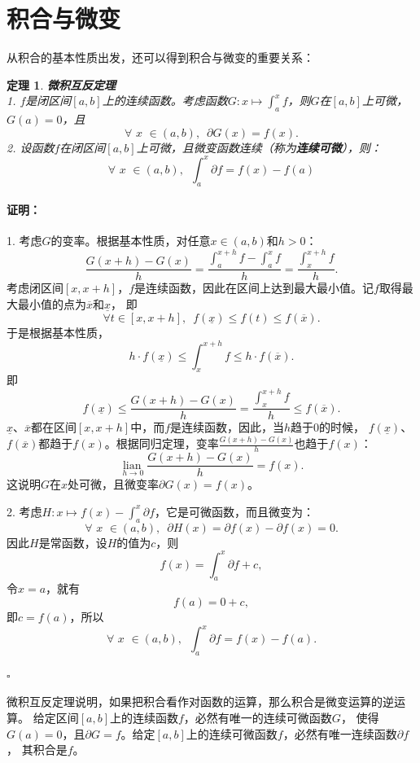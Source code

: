 \documentclass[12pt,UTF8]{ctexbook}
\newcommand{\lian}[1]{
    \underset{#1}{\operatorname{lian}\,}
}
\renewenvironment{proof}{\paragraph{\textbf{证明：}}}{\hfill$\square$}
\newtheorem{tm}{定理}[section]
\begin{document}
\section{积合与微变}
从积合的基本性质出发，还可以得到积合与微变的重要关系：

\begin{tm}{\textbf{微积互反定理}}
    \mbox{} \\
    1. $f$是闭区间$[a,b]$上的连续函数。考虑函数$G: x\mapsto \int_a^x f$，则$G$在$[a,b]$上可微，
    $G(a) = 0$，且
    $$\forall \,\, x\,\,\in(a, b), \,\,\, \partial G (x) = f(x).$$
    2. 设函数$f$在闭区间$[a,b]$上可微，且微变函数连续（称为\textbf{连续可微}），则：
    $$ \forall \,\, x\,\,\in(a, b), \,\,\, \int_a^x \partial f = f(x) - f(a) $$
\end{tm}

\begin{proof}
    1. 考虑$G$的变率。根据基本性质，对任意$x\in(a, b)$和$h>0$：
    $$ \frac{G(x+h) - G(x)}{h} = \frac{\int_a^{x+h} f - \int_a^x f}{h} = \frac{\int_x^{x+h} f}{h}. $$
    考虑闭区间$[x, x+h]$，$f$是连续函数，因此在区间上达到最大最小值。记$f$取得最大最小值的点为$\overline{x}$和$\underline{x}$，
    即
    $$ \forall t \in [x, x+h] ,\,\,\, f(\underline{x}) \leqslant f(t) \leqslant f(\overline{x}). $$
    于是根据基本性质，
    $$ h\cdot f(\underline{x}) \leqslant \int_x^{x+h} f \leqslant h\cdot f(\overline{x}). $$
    即
    $$ f(\underline{x}) \leqslant \frac{G(x+h) - G(x)}{h} = \frac{\int_x^{x+h} f}{h} \leqslant f(\overline{x}). $$
    $\underline{x}$、$\overline{x}$都在区间$[x, x+h]$中，而$f$是连续函数，因此，当$h$趋于$0$的时候，
    $f(\underline{x})$、$f(\overline{x})$都趋于$f(x)$。根据同归定理，变率$\frac{G(x+h) - G(x)}{h}$也趋于$f(x)$：
    $$ \lian{h\to 0} \frac{G(x+h) - G(x)}{h} = f(x).$$
    这说明$G$在$x$处可微，且微变率$\partial G (x) = f(x)$。

    2. 考虑$H: x\mapsto f(x) - \int_a^x \partial f$，它是可微函数，而且微变为：
    $$ \forall \,\, x\,\,\in(a, b), \,\,\, \partial H(x) = \partial f(x) - \partial f(x) = 0. $$
    因此$H$是常函数，设$H$的值为$c$，则
    $$f(x) = \int_a^x \partial f + c, $$
    令$x = a$，就有
    $$f(a) = 0 + c,$$
    即$c = f(a)$，所以
    $$ \forall \,\, x\,\,\in(a, b), \,\,\,\int_a^x \partial f = f(x) - f(a).$$

\end{proof}

微积互反定理说明，如果把积合看作对函数的运算，那么积合是微变运算的逆运算。
给定区间$[a,b]$上的连续函数$f$，必然有唯一的连续可微函数$G$，
使得$G(a) = 0$，且$\partial G = f$。给定$[a,b]$上的连续可微函数$f$，必然有唯一连续函数$\partial f$，
其积合是$f$。
\end{document}
